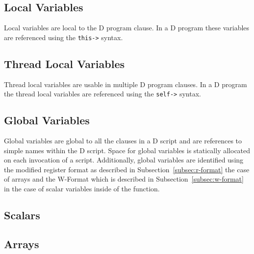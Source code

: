 




\subsection{Local Variables}
\label{sec:local-vars}

Local variables are local to the D program clause.  In a D program
these variables are referenced using the \verb|this->| syntax.  

\subsection{Thread Local Variables}
\label{sec:thread-local-vars}

Thread local variables are usable in multiple D program clauses.  In a
D program the thread local variables are referenced using the
\verb|self->| syntax.

\subsection{Global Variables}
\label{sec:globals-vars}

Global variables are global to all the clauses in a D script and are references
to simple names within the D script.  Space for global variables is statically
allocated on each invocation of a script. Additionally, global variables are
identified using the modified register format as described in
Subsection~\ref{subsec:r-format} the case of arrays and the W-Format
which is described in Subsection~\ref{subsec:w-format} in the case
of scalar variables inside of the  function.

\subsection{Scalars}
\label{sec:scalars}

\subsection{Arrays}
\label{sec:arrays}

